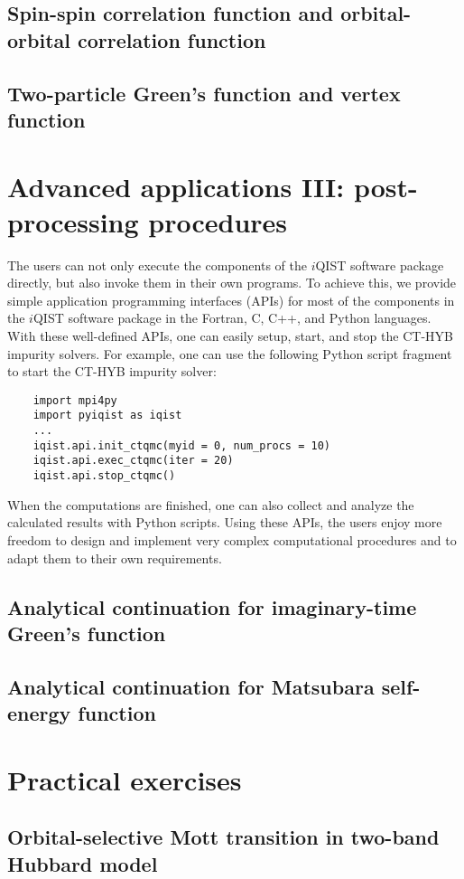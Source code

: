 \subsection{Spin-spin correlation function and orbital-orbital correlation function}
\subsection{Two-particle Green's function and vertex function}

\section{Advanced applications III: post-processing procedures}
The users can not only execute the components of the $i$QIST software package directly, but also invoke them in their own programs. To achieve this, we provide simple application programming interfaces (APIs) for most of the components in the $i$QIST software package in the Fortran, C, C++, and Python languages. With these well-defined APIs, one can easily setup, start, and stop the CT-HYB impurity solvers. For example, one can use the following Python script fragment to start the CT-HYB impurity solver:
\begin{verbatim}
    import mpi4py
    import pyiqist as iqist
    ...
    iqist.api.init_ctqmc(myid = 0, num_procs = 10)
    iqist.api.exec_ctqmc(iter = 20)
    iqist.api.stop_ctqmc()
\end{verbatim}
When the computations are finished, one can also collect and analyze the calculated results with Python scripts. Using these APIs, the users enjoy more freedom to design and implement very complex computational procedures and to adapt them to their own requirements.
\subsection{Analytical continuation for imaginary-time Green's function}
\subsection{Analytical continuation for Matsubara self-energy function}

\section{Practical exercises}
\subsection{Orbital-selective Mott transition in two-band Hubbard model}
